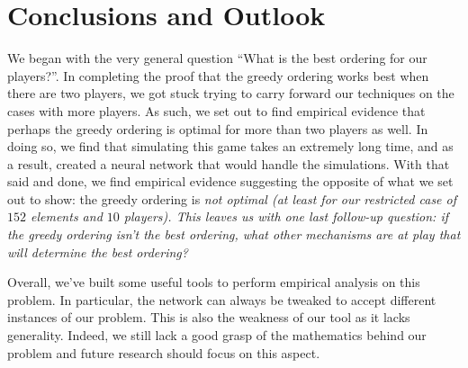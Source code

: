\section{Conclusions and Outlook}\label{Section:Outlook}
We began with the very general question ``What is the best ordering for our players?''.
In completing the proof that the greedy ordering works best when there are two players, we got stuck trying to carry forward our techniques on the cases with more players.
As such, we set out to find empirical evidence that perhaps the greedy ordering is optimal for more than two players as well.
In doing so, we find that simulating this game takes an extremely long time, and as a result, created a neural network that would handle the simulations.
With that said and done, we find empirical evidence suggesting the opposite of what we set out to show: the greedy ordering is \it{not} optimal (at least for our restricted case of $152$ elements and $10$ players).
This leaves us with one last follow-up question: if the greedy ordering isn't the best ordering, what other mechanisms are at play that will determine the best ordering?

Overall, we've built some useful tools to perform empirical analysis on this problem.
In particular, the network can always be tweaked to accept different instances of our problem.
This is also the weakness of our tool as it lacks generality.
Indeed, we still lack a good grasp of the mathematics behind our problem and future research should focus on this aspect.
